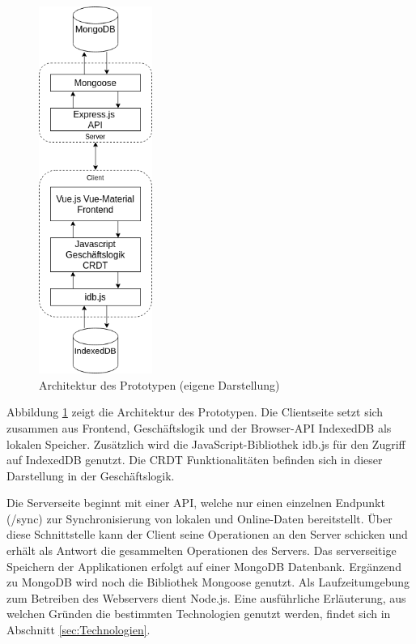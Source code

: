 \documentclass[a4paper, 12pt]{scrreprt}
\begin{document}
\begin{figure}[H]
	\centering
	\includegraphics[width=0.33\textwidth]{architektur.png}
	\caption[Architektur des Prototypen]{Architektur des Prototypen (eigene Darstellung)}
	\label{fig:architektur}
\end{figure}

Abbildung \ref{fig:architektur} zeigt die Architektur des Prototypen. Die Clientseite setzt sich zusammen aus Frontend, Geschäftslogik und der Browser-API IndexedDB als lokalen Speicher. Zusätzlich wird die JavaScript-Bibliothek idb.js für den Zugriff auf IndexedDB genutzt. Die CRDT Funktionalitäten befinden sich in dieser Darstellung in der Geschäftslogik. 

Die Serverseite beginnt mit einer API, welche nur einen einzelnen Endpunkt (/sync) zur Synchronisierung von lokalen und Online-Daten bereitstellt. Über diese Schnittstelle kann der Client seine Operationen an den Server schicken und erhält als Antwort die gesammelten Operationen des Servers. Das serverseitige Speichern der Applikationen erfolgt auf einer MongoDB Datenbank. Ergänzend zu MongoDB wird noch die Bibliothek Mongoose genutzt. Als Laufzeitumgebung zum Betreiben des Webservers dient Node.js. Eine ausführliche Erläuterung, aus welchen Gründen die bestimmten Technologien genutzt werden, findet sich in Abschnitt \ref{sec:Technologien}.
\end{document}
